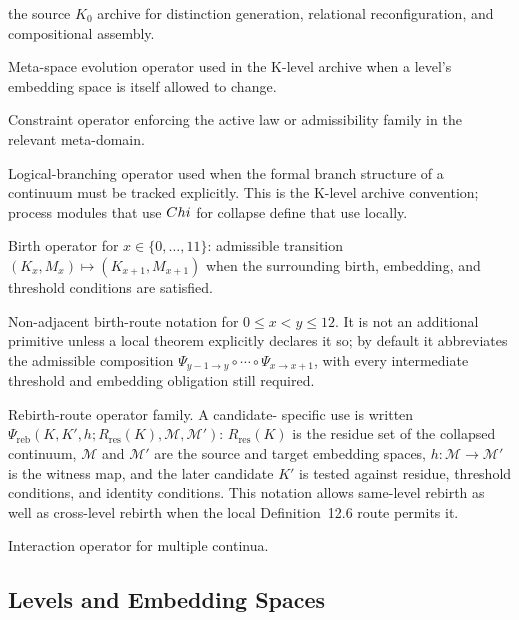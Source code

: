 \begin{description}
        the source \(K_0\) archive for distinction generation, relational
        reconfiguration, and compositional assembly.
  \item[\(\Phi\)] Meta-space evolution operator used in the K-level archive
        when a level's embedding space is itself allowed to change.
  \item[\(\Lambda\)] Constraint operator enforcing the active law or
        admissibility family in the relevant meta-domain.
  \item[\(\Chi\)] Logical-branching operator used when the formal branch
        structure of a continuum must be tracked explicitly. This is the
        K-level archive convention; process modules that use \(\Chi\) for
        collapse define that use locally.
  \item[\(\Psi_{x\to x+1}\)] Birth operator for \(x\in\{0,\dots,11\}\):
        admissible transition \((K_x,M_x)\mapsto (K_{x+1},M_{x+1})\) when
        the surrounding birth, embedding, and threshold conditions are
        satisfied.
  \item[\(\Psi_{x\to y}\)] Non-adjacent birth-route notation for
        \(0\le x<y\le 12\). It is
        not an additional primitive unless a local theorem explicitly declares
        it so; by default it abbreviates the admissible composition
        \(\Psi_{y-1\to y}\circ\cdots\circ\Psi_{x\to x+1}\), with every
        intermediate threshold and embedding obligation still required.
  \item[\(\Psi_{\mathrm{reb}}\)] Rebirth-route operator family. A candidate-
        specific use is written
        \(\Psi_{\mathrm{reb}}(K,K',h;R_{\mathrm{res}}(K),\mathcal{M},\mathcal{M}')\):
        \(R_{\mathrm{res}}(K)\) is the residue set of the collapsed continuum,
        \(\mathcal{M}\) and \(\mathcal{M}'\) are the source and target
        embedding spaces, \(h:\mathcal{M}\to\mathcal{M}'\) is the witness map,
        and the later candidate \(K'\) is tested against residue, threshold
        conditions, and identity conditions. This notation allows same-level
        rebirth as well as cross-level rebirth when the local Definition~12.6
        route permits it.
  \item[\(E_{\mathrm{int}}\)] Interaction operator for multiple continua.
\end{description}

\subsection{Levels and Embedding Spaces}

